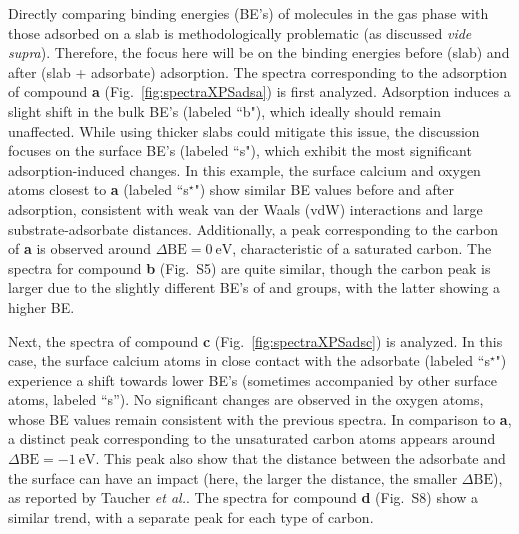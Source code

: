\documentclass[%
aip,
amsmath,amssymb,
preprint,%
jcp,
showkeys,
]{revtex4-2}
\def\dbe{\ensuremath{\Delta\text{BE}}}
\begin{document}
Directly comparing binding energies (BE's) of molecules in the gas phase with those adsorbed on a slab is methodologically problematic (as discussed \textit{vide supra}). Therefore, the focus here will be on the binding energies before (slab) and after (slab + adsorbate) adsorption.
The spectra corresponding to the adsorption of compound \textbf{a} (Fig.~\ref{fig:spectraXPSadsa}) is first analyzed. Adsorption induces a slight shift in the bulk BE's (labeled ``b"), which ideally should remain unaffected. While using thicker slabs could mitigate this issue, the discussion  focuses on the surface BE's (labeled ``s"), which exhibit the most significant adsorption-induced changes. In this example, the surface calcium and oxygen atoms closest to \textbf{a} (labeled ``s$^\star$") show similar BE values before and after adsorption, consistent with weak van der Waals (vdW) interactions and large substrate-adsorbate distances. Additionally, a peak corresponding to the carbon of \textbf{a} is observed around $\dbe = \SI{0}{\electronvolt}$, characteristic of a saturated carbon. The spectra for compound \textbf{b} (Fig.~S5) are quite similar, though the carbon peak is larger due to the slightly different BE's of  and  groups, with the latter showing a higher BE.


\clearpage

Next, the spectra of compound \textbf{c} (Fig.~\ref{fig:spectraXPSadsc}) is analyzed. In this case, the surface calcium atoms in close contact with the adsorbate (labeled ``s$^\star$") experience a shift towards lower BE's (sometimes accompanied by other surface atoms,  labeled ``s''). No significant changes are observed in the oxygen atoms, whose BE values remain consistent with the previous spectra. In comparison to \textbf{a}, a distinct peak corresponding to the unsaturated carbon atoms appears around $\dbe = \SI{-1}{\electronvolt}$. This peak also show that the distance between the adsorbate and the surface can have an impact (here, the larger the distance, the smaller \dbe{}), as reported by Taucher \emph{et al.}\cite{taucherFinalStateSimulationsCoreLevel2020}. The spectra for compound \textbf{d} (Fig.~S8) show a similar trend, with a separate peak for each type of carbon.


\clearpage
\end{document}
